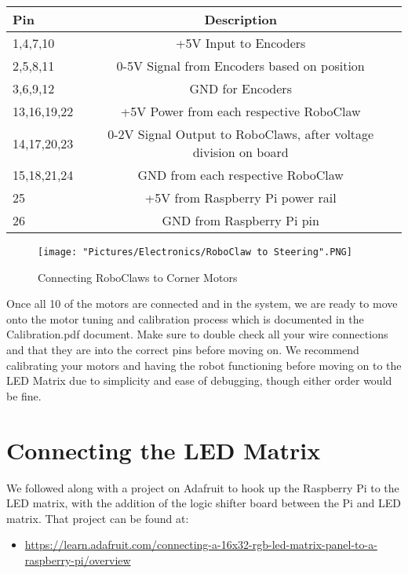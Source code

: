\documentclass[12pt]{article}
\begin{document}
\begin{tabular}[2] {| l | c |}
	\hline
	\textbf{Pin} & \textbf{Description} \\ \hline
	1,4,7,10 & +5V Input to Encoders \\ \hline
	2,5,8,11 & 0-5V Signal from Encoders based on position \\ \hline
	3,6,9,12 & GND for Encoders \\ \hline \hline
	13,16,19,22 & +5V Power from each respective RoboClaw \\ \hline
	14,17,20,23 & 0-2V Signal Output to RoboClaws, after voltage division on board \\ \hline
	15,18,21,24 & GND from each respective RoboClaw \\ \hline \hline
	25 & +5V from Raspberry Pi power rail \\ \hline
	26 & GND from Raspberry Pi pin \\ \hline
\end{tabular}

\begin{figure}[H]
 	\centering
	\texttt{[image: "Pictures/Electronics/RoboClaw to Steering".PNG]}
 	\caption{Connecting RoboClaws to Corner Motors}
	\label{RC to Steering}
\end{figure}

Once all 10 of the motors are connected and in the system, we are ready to move onto the motor tuning and calibration process which is documented in the Calibration.pdf document. Make sure to double check all your wire connections and that they are into the correct pins before moving on. We recommend calibrating your motors and having the robot functioning before moving on to the LED Matrix due to simplicity and ease of debugging, though either order would be fine.

\section{Connecting the LED Matrix}
We followed along with a project on Adafruit to hook up the Raspberry Pi to the LED matrix, with the addition of the logic shifter board between the Pi and LED matrix. That project can be found at:

\begin{itemize}
	\item \href{https://learn.adafruit.com/connecting-a-16x32-rgb-led-matrix-panel-to-a-raspberry-pi/overview}{https://learn.adafruit.com/connecting-a-16x32-rgb-led-matrix-panel-to-a-raspberry-pi/overview}
\end{itemize}
\end{document}
